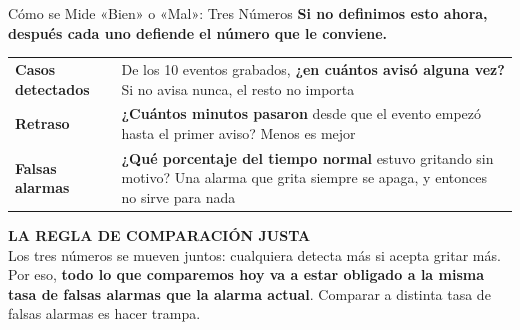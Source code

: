 \documentclass[aspectratio=169, 11pt]{beamer}
\begin{document}
\begin{frame}[shrink=16]{Cómo se Mide «Bien» o «Mal»: Tres Números}
  \vspace{-4pt}
  {\small\color{arcaDark}\bfseries
   Si no definimos esto ahora, después cada uno defiende el número que le
   conviene.}
  \vspace{7pt}
  {\footnotesize
  \renewcommand{\arraystretch}{1.35}
  \begin{tabular}{@{}p{3.7cm}p{10.7cm}@{}}
    \toprule
    {\color{arcaDark}\bfseries Casos detectados} &
      De los 10 eventos grabados, \textbf{¿en cuántos avisó alguna vez?}
      Si no avisa nunca, el resto no importa \\
    {\color{arcaDark}\bfseries Retraso} &
      \textbf{¿Cuántos minutos pasaron} desde que el evento empezó hasta el
      primer aviso? Menos es mejor \\
    {\color{arcaDark}\bfseries Falsas alarmas} &
      \textbf{¿Qué porcentaje del tiempo normal} estuvo gritando sin motivo?
      Una alarma que grita siempre se apaga, y entonces no sirve para nada \\
    \bottomrule
  \end{tabular}}
  \vspace{9pt}

  \begin{tcolorbox}[colback=arcaGray, colframe=arcaRed, boxrule=0pt, leftrule=3pt,
    arc=3pt, left=8pt, right=8pt, top=5pt, bottom=5pt]
    {\scriptsize\color{arcaRed}\bfseries\faBalanceScale\hspace{4pt}LA REGLA DE COMPARACIÓN JUSTA}\\[4pt]
    {\scriptsize\color{textMuted}
     Los tres números se mueven juntos: cualquiera detecta más si acepta
     gritar más. Por eso, \textbf{todo lo que comparemos hoy va a estar
     obligado a la misma tasa de falsas alarmas que la alarma actual}.
     Comparar a distinta tasa de falsas alarmas es hacer trampa.}
  \end{tcolorbox}
\end{frame}
\end{document}
